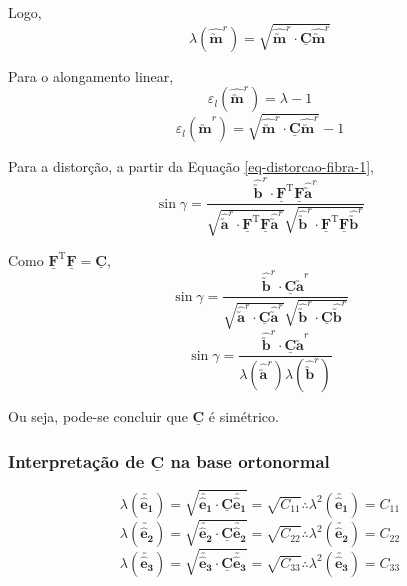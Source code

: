 	Logo,
	\begin{equation}
		\lambda(\hat{\utilde{\mathbf{m}}}^r)=\sqrt{\hat{\utilde{\mathbf{m}}}^r\cdot\underline{\mathbf{C}}\hat{\utilde{\mathbf{m}}}^r}
	\end{equation}
	
	Para o alongamento linear,
	\[\varepsilon_l(\hat{\utilde{\mathbf{m}}}^r)=\lambda-1\]
	\begin{equation}\label{eq-alongamento-linear-1}
		\varepsilon_l(\hat{\utilde{\mathbf{m}}}^r)=\sqrt{\hat{\utilde{\mathbf{m}}}^r\cdot\underline{\mathbf{C}}\hat{\utilde{\mathbf{m}}}^r}-1
	\end{equation}
	
	Para a distorção, a partir da Equação \eqref{eq-distorcao-fibra-1},
	\[\sin\gamma=\frac{\hat{\utilde{\mathbf{b}}}^r\cdot\underline{\mathbf{F}}^{\text{T}}\underline{\mathbf{F}}\hat{\utilde{\mathbf{a}}}^r}{\sqrt{\hat{\utilde{\mathbf{a}}}^r\cdot\underline{\mathbf{F}}^{\text{T}}\underline{\mathbf{F}}\hat{\utilde{\mathbf{a}}}^r}\sqrt{\hat{\utilde{\mathbf{b}}}^r\cdot\underline{\mathbf{F}}^{\text{T}}\underline{\mathbf{F}}\hat{\utilde{\mathbf{b}}}^r}}\]
	
	Como $\underline{\mathbf{F}}^{\text{T}}\underline{\mathbf{F}}=\underline{\mathbf{C}}$,
	\[\sin\gamma=\frac{\hat{\utilde{\mathbf{b}}}^r\cdot\underline{\mathbf{C}}\hat{\utilde{\mathbf{a}}}^r}{\sqrt{\hat{\utilde{\mathbf{a}}}^r\cdot\underline{\mathbf{C}}\hat{\utilde{\mathbf{a}}}^r}\sqrt{\hat{\utilde{\mathbf{b}}}^r\cdot\underline{\mathbf{C}}\hat{\utilde{\mathbf{b}}}^r}}\]
	\[\sin\gamma=\frac{\hat{\utilde{\mathbf{b}}}^r\cdot\underline{\mathbf{C}}\hat{\utilde{\mathbf{a}}}^r}{\lambda(\hat{\utilde{\mathbf{a}}}^r)\lambda(\hat{\utilde{\mathbf{b}}}^r)}\]
	
	Ou seja, pode-se concluir que $\underline{\mathbf{C}}$ é simétrico.
	
	\subsubsection{Interpretação de $\underline{\mathbf{C}}$ na base ortonormal}
	\[\lambda(\utilde{\mathbf{\hat{e}_1}})=\sqrt{\utilde{\mathbf{\hat{e}_1}}\cdot\underline{\mathbf{C}}\utilde{\mathbf{\hat{e}_1}}}=\sqrt{C_{11}}\therefore\lambda^2(\utilde{\mathbf{\hat{e}_1}})=C_{11}\]
	\[\lambda(\utilde{\mathbf{\hat{e}_2}})=\sqrt{\utilde{\mathbf{\hat{e}_2}}\cdot\underline{\mathbf{C}}\utilde{\mathbf{\hat{e}_2}}}=\sqrt{C_{22}}\therefore\lambda^2(\utilde{\mathbf{\hat{e}_2}})=C_{22}\]
	\[\lambda(\utilde{\mathbf{\hat{e}_3}})=\sqrt{\utilde{\mathbf{\hat{e}_3}}\cdot\underline{\mathbf{C}}\utilde{\mathbf{\hat{e}_3}}}=\sqrt{C_{33}}\therefore\lambda^2(\utilde{\mathbf{\hat{e}_3}})=C_{33}\]
	
